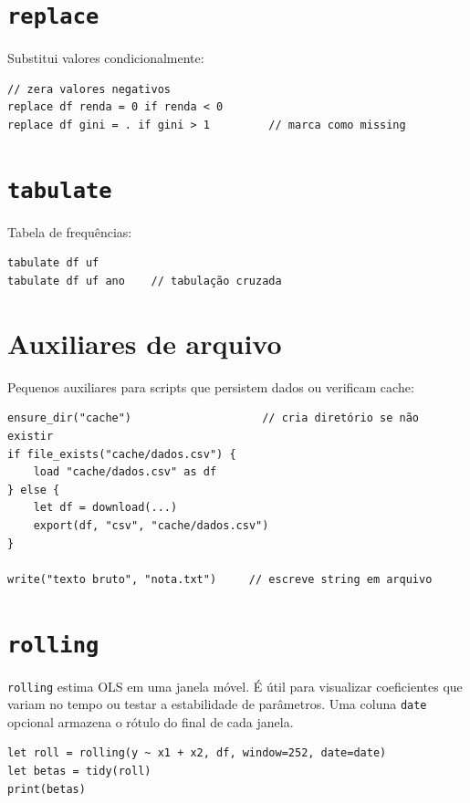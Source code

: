 \section{\texttt{replace}}

Substitui valores condicionalmente:

\begin{lstlisting}
// zera valores negativos
replace df renda = 0 if renda < 0
replace df gini = . if gini > 1         // marca como missing
\end{lstlisting}

\section{\texttt{tabulate}}

Tabela de frequências:

\begin{lstlisting}
tabulate df uf
tabulate df uf ano    // tabulação cruzada
\end{lstlisting}

\section{Auxiliares de arquivo}

Pequenos auxiliares para scripts que persistem dados ou verificam cache:

\begin{lstlisting}[caption={Auxiliares de cache}]
ensure_dir("cache")                    // cria diretório se não existir
if file_exists("cache/dados.csv") {
    load "cache/dados.csv" as df
} else {
    let df = download(...)
    export(df, "csv", "cache/dados.csv")
}

write("texto bruto", "nota.txt")     // escreve string em arquivo
\end{lstlisting}

\section{\texttt{rolling}}

\texttt{rolling} estima OLS em uma janela móvel. É útil para visualizar
coeficientes que variam no tempo ou testar a estabilidade de parâmetros.
Uma coluna \texttt{date} opcional armazena o rótulo do final de cada
janela.

\begin{lstlisting}[caption={OLS rolante com rótulos de data}]
let roll = rolling(y ~ x1 + x2, df, window=252, date=date)
let betas = tidy(roll)
print(betas)
\end{lstlisting}

